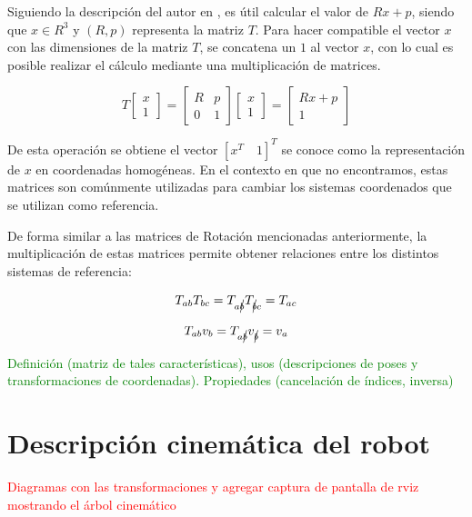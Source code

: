 Siguiendo la descripción del autor en \cite{lynch_modern_2017}, es útil calcular el valor de $Rx+p$, siendo que $x \in R^{3}$ y $(R,p)$ representa la matriz $T$. Para hacer compatible el vector $x$ con las dimensiones de la matriz $T$, se concatena un $1$ al vector $x$, con lo cual es posible realizar el cálculo mediante una multiplicación de matrices.

\begin{equation*}
    T \begin{bmatrix}
        x\\1
    \end{bmatrix} = 
    \begin{bmatrix}
	R & p\\
	0 & 1 
	\end{bmatrix}
    \begin{bmatrix}
	x\\
	1 
	\end{bmatrix}=
    \begin{bmatrix}
	Rx + p\\
    1 
	\end{bmatrix}
\end{equation*}

De esta operación se obtiene el vector $ \left[x^{T}\quad 1\right]^{T}$ se conoce como la representación de $x$ en coordenadas homogéneas. En el contexto en que no encontramos, estas matrices son comúnmente utilizadas para cambiar los sistemas coordenados que se utilizan como referencia. 

De forma similar a las matrices de Rotación mencionadas anteriormente, la multiplicación de estas matrices permite obtener relaciones entre los distintos sistemas de referencia:

\begin{equation*}
    T_{ab}T_{bc} = T_{a\cancel{b}}T_{\cancel{b}c}=T_{ac}
\end{equation*}

\begin{equation*}
    T_{ab}v_{b} = T_{a\cancel{b}}v_{\cancel{b}}=v_{a}
\end{equation*}


\textcolor{green}{Definición (matriz de tales características), usos (descripciones de poses y transformaciones de coordenadas). Propiedades (cancelación de índices, inversa)}

\section{Descripción cinemática del robot}
\textcolor{red}{Diagramas con las transformaciones y agregar captura de pantalla de rviz mostrando el árbol cinemático}

